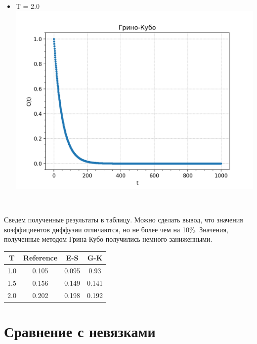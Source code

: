 \begin{minipage}{0.45\textwidth}
\begin{center}
\begin{itemize}
    \item T = 2.0\\
    
    \includegraphics[width=\linewidth]{f.png}\\
    
    \end{itemize}
    \end{center}
\end{minipage}

\

\newline

Сведем полученные результаты в таблицу. Можно сделать вывод, что значения коэффициентов диффузии отличаются, но не более чем на 10\%. Значения, полученные методом Грина-Кубо получились немного заниженными. 

\begin{center}
\begin{tabular}{|c|c|c|c|}
\hline
T&Reference& E-S&G-K \\
\hline
1.0&0.105 &0.095&0.93	\\
\hline
1.5&0.156&0.149&0.141	\\
\hline
2.0&0.202&0.198&0.192	\\
\hline
\end{tabular}
\end{center}

\newpage

\section{Сравнение с невязками}

